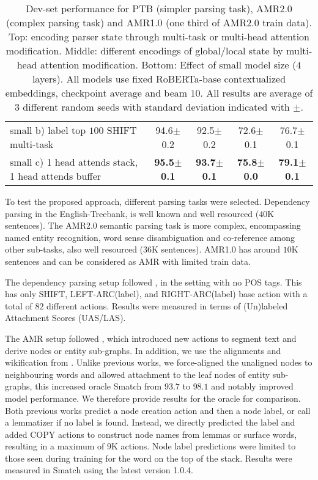 \documentclass[11pt,a4paper]{article}
\begin{document}
\begin{table*}[ht!]
{\begin{tabular}{l|c|c|c|c}
small b) label top $100$ SHIFT multi-task                & 94.6\footnotesize{$\pm$0.2}  & 92.5\footnotesize{$\pm$0.2} & 72.6\footnotesize{$\pm$0.1}& 76.7\footnotesize{$\pm$0.1}\\
small c)  1 head attends stack, 1 head attends buffer    & {\bf 95.5\footnotesize{$\pm$0.1}}  & {\bf 93.7\footnotesize{$\pm$0.1}} & {\bf 75.8\footnotesize{$\pm$0.0}}& {\bf 79.1\footnotesize{$\pm$0.1}}\\
\hline
\end{tabular}
}
\caption{Dev-set performance for PTB (simpler parsing task), AMR2.0 (complex parsing task) and AMR1.0 (one third of AMR2.0 train data). Top: encoding parser state through multi-task or multi-head attention modification. Middle: different encodings of global/local state by multi-head attention modification. Bottom: Effect of small model size ($4$ layers). All models use fixed RoBERTa-base contextualized embeddings, checkpoint average and beam $10$. All results are average of $3$ different random seeds with standard deviation indicated with $\pm$.}
\label{table:dev}
\end{table*}

To test the proposed approach, different parsing tasks were selected. Dependency parsing in the English-Treebank, is well known and well resourced ($40$K sentences). The AMR2.0 semantic parsing task is more complex, encompassing named entity recognition, word sense disambiguation and co-reference among other sub-tasks, also well resourced ($36$K sentences). AMR1.0 has around $10$K sentences and can be considered as AMR with limited train data. 

The dependency parsing setup followed \citet{dyer2015transition}, in the setting with no POS tags. This has only \textrm{SHIFT}, \textrm{LEFT-ARC(label)}, and \textrm{RIGHT-ARC(label)} base action with a total of $82$ different actions. Results were measured in terms of (Un)labeled Attachment Scores (UAS/LAS).

The AMR setup followed \citet{ballesteros2017amr}, which introduced new actions to segment text and derive nodes or entity sub-graphs. In addition, we use the alignments and wikification from \citet{naseem2019rewarding}. Unlike previous works, we force-aligned the unaligned nodes to neighbouring words and allowed attachment to the leaf nodes of entity sub-graphs, this increased oracle Smatch from $93.7$ to $98.1$ and notably improved model performance. We therefore provide results for the  oracle for comparison. Both previous works predict a node creation action and then a node label, or call a lemmatizer if no label is found. Instead, we directly predicted the label and added \textrm{COPY} actions to construct node names from lemmas\footnotemark{} or surface words, resulting in a maximum of $9$K actions. Node label predictions were limited to those seen during training for the word on the top of the stack. Results were measured in Smatch \cite{cai-knight-2013-smatch} using the latest version \textrm{1.0.4}\footnotemark{}. 
\end{document}
